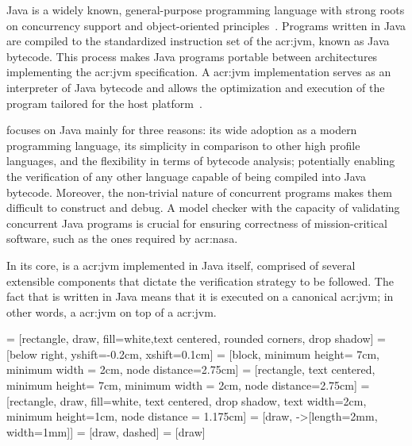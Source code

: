Java is a widely known, general-purpose programming language with strong roots on concurrency support and object-oriented principles~\cite{Gosling2014}. Programs written in Java are compiled to the standardized instruction set of the \acrfull{acr:jvm}, known as Java bytecode. This process makes Java programs portable between architectures implementing the \acrshort{acr:jvm} specification. A \acrshort{acr:jvm} implementation serves as an interpreter of Java bytecode and allows the optimization and execution of the program tailored for the host platform~\cite{Lindholm2014}.

\jpf{} focuses on Java mainly for three reasons: its wide adoption as a modern programming language, its simplicity in comparison to other high profile languages, and the flexibility in terms of bytecode analysis; potentially enabling the verification of any other language capable of being compiled into Java bytecode. Moreover, the non-trivial nature of concurrent programs makes them difficult to construct and debug. A model checker with the capacity of validating concurrent Java programs is crucial for ensuring correctness of mission-critical software, such as the ones required by \acrshort{acr:nasa}.

In its core, \jpf{} is a \acrlong{acr:jvm} implemented in Java itself, comprised of several extensible components that dictate the verification strategy to be followed. The fact that \jpf{} is written in Java means that it is executed on a canonical \acrshort{acr:jvm}; in other words, a \acrshort{acr:jvm} on top of a \acrshort{acr:jvm}. 

 = [rectangle, draw, fill=white,text centered, rounded corners, drop shadow]
 = [below right, yshift=-0.2cm, xshift=0.1cm]
 = [block, minimum height= 7cm, minimum width = 2cm, node distance=2.75cm]
 = [rectangle, text centered, minimum height= 7cm, minimum width = 2cm, node distance=2.75cm]
 = [rectangle, draw, fill=white, text centered, drop shadow, text width=2cm, minimum height=1cm, node distance = 1.175cm]
  = [draw, -{>[length=2mm, width=1mm]}]
 = [draw, dashed]
 = [draw]

